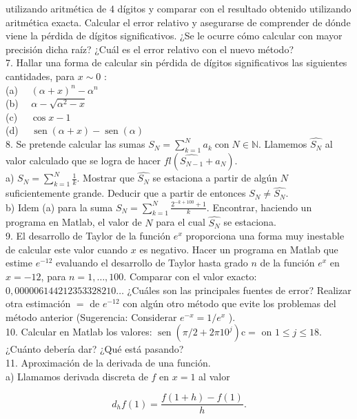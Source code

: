 \documentclass[10pt]{book}
\begin{document}
utilizando aritmética de 4 dígitos y comparar con el resultado obtenido utilizando aritmética exacta. Calcular el error relativo y asegurarse de comprender de dónde viene la pérdida de dígitos significativos. ¿Se le ocurre cómo calcular con mayor precisión dicha raíz? ¿Cuál es el error relativo con el nuevo método?\\
7. Hallar una forma de calcular sin pérdida de dígitos significativos las siguientes cantidades, para $x \sim 0$ :\\
(a) $\quad(\alpha+x)^{n}-\alpha^{n}$\\
(b) $\quad \alpha-\sqrt{\alpha^{2}-x}$\\
(c) $\quad \cos x-1$\\
(d) $\quad \operatorname{sen}(\alpha+x)-\operatorname{sen}(\alpha)$\\
8. Se pretende calcular las sumas $S_{N}=\sum_{k=1}^{N} a_{k} \operatorname{con} N \in \mathbb{N}$. Llamemos $\widehat{S_{N}}$ al valor calculado que se logra de hacer $f l\left(\widehat{S_{N-1}}+a_{N}\right)$.\\
a) $S_{N}=\sum_{k=1}^{N} \frac{1}{k}$. Mostrar que $\widehat{S_{N}}$ se estaciona a partir de algún $N$ suficientemente grande. Deducir que a partir de entonces $S_{N} \neq \widehat{S_{N}}$.\\
b) Idem (a) para la suma $S_{N}=\sum_{k=1}^{N} \frac{2^{-k+100}+1}{k}$. Encontrar, haciendo un programa en Matlab, el valor de $N$ para el cual $\widehat{S_{N}}$ se estaciona.\\
9. El desarrollo de Taylor de la función $e^{x}$ proporciona una forma muy inestable de calcular este valor cuando $x$ es negativo. Hacer un programa en Matlab que estime $e^{-12}$ evaluando el desarrollo de Taylor hasta grado $n$ de la función $e^{x}$ en $x=-12$, para $n=1, \ldots, 100$. Comparar con el valor exacto: $0,000006144212353328210 \ldots$ ¿Cuáles son las principales fuentes de error? Realizar otra estimación $=$ de $e^{-12}$ con algún otro método que evite los problemas del método anterior (Sugerencia: Considerar $e^{-x}=1 / e^{x}$ ).\\
10. Calcular en Matlab los valores: $\operatorname{sen}\left(\pi / 2+2 \pi 10^{j}\right) \mathrm{c}=$ on $1 \leq j \leq 18$. ¿Cuánto debería dar? ¿Qué está pasando?\\
11. Aproximación de la derivada de una función.\\
a) Llamamos derivada discreta de $f$ en $x=1$ al valor

$$
d_{h} f(1)=\frac{f(1+h)-f(1)}{h} .
$$
\end{document}
